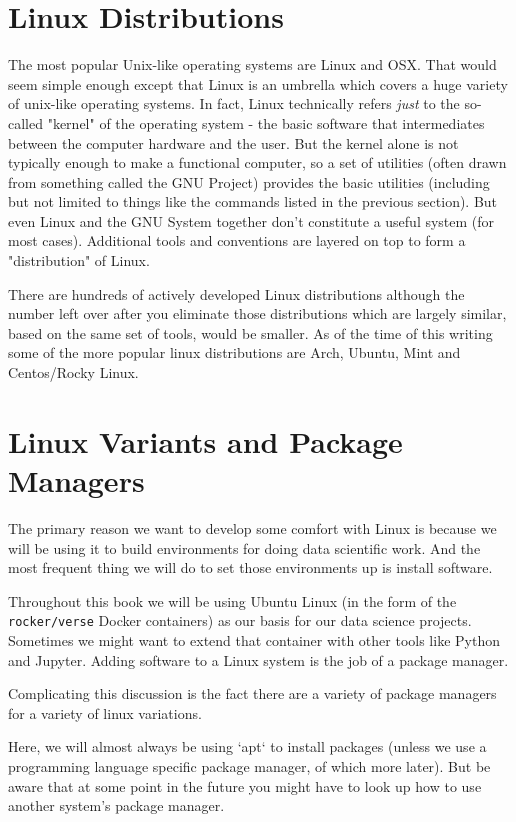 \documentclass[11pt]{article}
\begin{document}
\section{Linux Distributions}
\label{sec:org6044715}

The most popular Unix-like operating systems are Linux and OSX. That
would seem simple enough except that Linux is an umbrella which covers
a huge variety of unix-like operating systems.  In fact, Linux
technically refers \emph{just} to the so-called "kernel" of the operating
system - the basic software that intermediates between the computer
hardware and the user. But the kernel alone is not typically enough to
make a functional computer, so a set of utilities (often drawn from
something called the GNU Project) provides the basic utilities
(including but not limited to things like the commands listed in the
previous section). But even Linux and the GNU System together don't
constitute a useful system (for most cases). Additional tools and
conventions are layered on top to form a "distribution" of Linux.

There are hundreds of actively developed Linux distributions although
the number left over after you eliminate those distributions which are
largely similar, based on the same set of tools, would be smaller. As
of the time of this writing some of the more popular linux
distributions are Arch, Ubuntu, Mint and Centos/Rocky Linux.

\section{Linux Variants and Package Managers}
\label{sec:org5c9ea9b}

The primary reason we want to develop some comfort with Linux is
because we will be using it to build environments for doing data
scientific work. And the most frequent thing we will do to set those
environments up is install software.

Throughout this book we will be using Ubuntu Linux (in the form of the
\texttt{rocker/verse} Docker containers) as our basis for our data science
projects. Sometimes we might want to extend that container with other
tools like Python and Jupyter. Adding software to a Linux system is
the job of a package manager.

Complicating this discussion is the fact there are a variety of
package managers for a variety of linux variations.

Here, we will almost always be using `apt` to install packages (unless
we use a programming language specific package manager, of which more
later). But be aware that at some point in the future you might have
to look up how to use another system's package manager.
\end{document}
